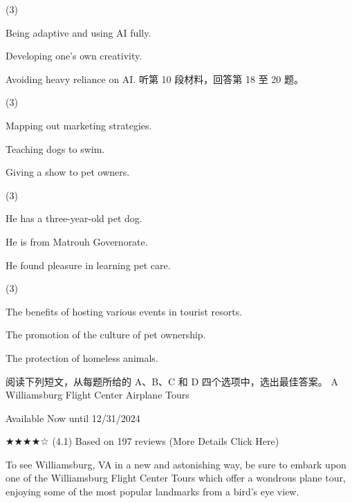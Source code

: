 \documentclass{英语试卷}
\begin{document}
\begin{choices}(3)
  \item Being adaptive and using AI fully.
  \item Developing one's own creativity.
  \item Avoiding heavy reliance on AI. 听第 10 段材料，回答第 18 至 20 题。
\end{choices}
\begin{choices}(3)
  \item Mapping out marketing strategies.
  \item Teaching dogs to swim.
  \item Giving a show to pet owners.
\end{choices}
\begin{choices}(3)
  \item He has a three-year-old pet dog.
  \item He is from Matrouh Governorate.
  \item He found pleasure in learning pet care.
\end{choices}
\begin{choices}(3)
  \item The benefits of hosting various events in tourist resorts.
  \item The promotion of the culture of pet ownership.
  \item The protection of homeless animals.
\end{choices}
\par 阅读下列短文，从每题所给的 A、B、C 和 D 四个选项中，选出最佳答案。 A Williamsburg Flight Center Airplane Tours\par
\par Available Now until 12/31/2024\par
\par ★★★★☆ (4.1) Based on 197 reviews (More Details Click Here)\par
\par To see Williamsburg, VA in a new and astonishing way, be sure to embark upon one of the Williamsburg Flight Center Tours which offer a wondrous plane tour, enjoying some of the most popular landmarks from a bird's eye view.\par
\end{document}
